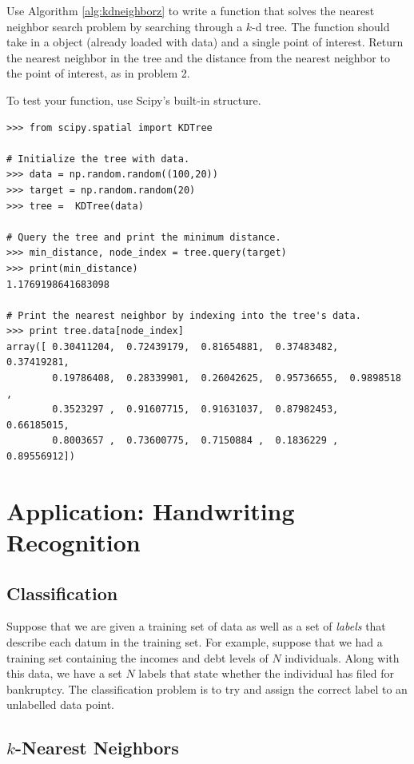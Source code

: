 \begin{problem}
Use Algorithm \ref{alg:kdneighborz} to write a function that solves the nearest neighbor search problem by searching through a $k$-d tree.
The function should take in a  object (already loaded with data) and a single point of interest.
Return the nearest neighbor in the tree and the distance from the nearest neighbor to the point of interest, as in problem 2.

To test your function, use Scipy's built-in  structure.

\begin{lstlisting}
>>> from scipy.spatial import KDTree

# Initialize the tree with data.
>>> data = np.random.random((100,20))
>>> target = np.random.random(20)
>>> tree =  KDTree(data)

# Query the tree and print the minimum distance.
>>> min_distance, node_index = tree.query(target)
>>> print(min_distance)
1.1769198641683098

# Print the nearest neighbor by indexing into the tree's data.
>>> print tree.data[node_index]
array([ 0.30411204,  0.72439179,  0.81654881,  0.37483482,  0.37419281,
        0.19786408,  0.28339901,  0.26042625,  0.95736655,  0.9898518 ,
        0.3523297 ,  0.91607715,  0.91631037,  0.87982453,  0.66185015,
        0.8003657 ,  0.73600775,  0.7150884 ,  0.1836229 ,  0.89556912])
\end{lstlisting}
\end{problem}

\section*{Application: Handwriting Recognition}

\subsection*{Classification}

Suppose that we are given a training set of data as well as a set of \emph{labels} that describe each datum in the training set.
For example, suppose that we had a training set containing the incomes and debt levels of $N$ individuals.
Along with this data, we have a set $N$ labels that state whether the individual has filed for bankruptcy.
The classification problem is to try and assign the correct label to an unlabelled data point.

\subsection*{$k$-Nearest Neighbors}

